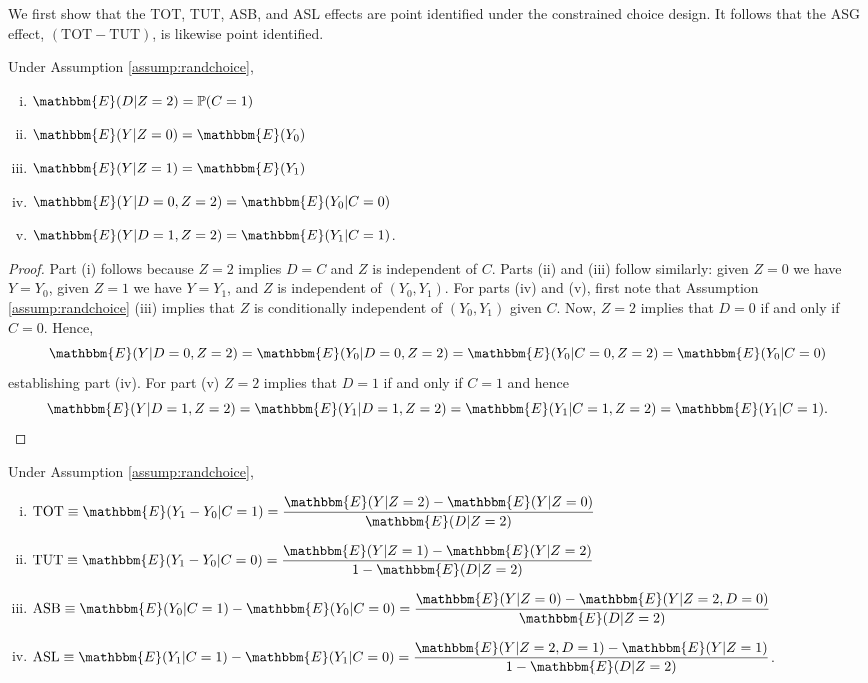 We first show that the TOT, TUT, ASB, and ASL effects are point identified under the constrained choice design.
It follows that the ASG effect, $(\text{TOT} - \text{TUT})$, is likewise point identified. 

\begin{lem}
Under Assumption \ref{assump:randchoice},
\label{lem_randchoice}
   \begin{enumerate}[(i)]
       \item $\mathbbm{E}(D|Z=2) = \mathbb{P}(C=1)$
       \item $\mathbbm{E}(Y|Z=0) = \mathbbm{E}(Y_0)$
       \item $\mathbbm{E}(Y|Z=1) = \mathbbm{E}(Y_1)$
       \item $\mathbbm{E}(Y|D=0,Z=2) = \mathbbm{E}(Y_0|C=0)$
       \item $\mathbbm{E}(Y|D=1,Z=2) = \mathbbm{E}(Y_1|C=1)$.
   \end{enumerate} 
\end{lem}

\begin{proof}
Part (i) follows because $Z=2$ implies $D=C$ and $Z$ is independent of $C$.  
Parts (ii) and (iii) follow similarly: given $Z=0$ we have $Y = Y_0$, given $Z=1$ we have $Y = Y_1$, and $Z$ is independent of $(Y_0,Y_1)$.
For parts (iv) and (v), first note that Assumption \ref{assump:randchoice} (iii) implies that $Z$ is conditionally independent of $(Y_0,Y_1)$ given $C$.
Now, $Z=2$ implies that $D=0$ if and only if $C=0$. Hence,
\[
\mathbbm{E}(Y|D=0, Z=2) = \mathbbm{E}(Y_0|D=0, Z=2) = \mathbbm{E}(Y_0|C=0, Z=2)=\mathbbm{E}(Y_0|C=0)
\]
establishing part (iv).
For part (v) $Z=2$ implies that $D=1$ if and only if $C=1$ and hence
\[
\mathbbm{E}(Y|D=1, Z=2) = \mathbbm{E}(Y_1|D=1, Z=2) = \mathbbm{E}(Y_1|C=1, Z=2)= \mathbbm{E}(Y_1|C=1). %
\]
\end{proof}

\begin{prop} 
Under Assumption \ref{assump:randchoice},
    \begin{enumerate}[(i)]
        \item $\text{TOT} \equiv \mathbbm{E}(Y_1 - Y_0|C=1)  = \displaystyle \frac{\mathbbm{E}(Y|Z=2) - \mathbbm{E}(Y|Z=0)}{\mathbbm{E}(D|Z=2)}$
        \item $\text{TUT} \equiv \mathbbm{E}(Y_1 - Y_0|C=0) = \displaystyle \frac{\mathbbm{E}(Y|Z=1) - \mathbbm{E}(Y|Z=2)}{1 - \mathbbm{E}(D|Z=2)}$
        \item $\text{ASB} \equiv \mathbbm{E}(Y_0|C=1) - \mathbbm{E}(Y_0|C=0) = \displaystyle \frac{\mathbbm{E}(Y|Z=0) - \mathbbm{E}(Y|Z=2,D=0)}{\mathbbm{E}(D|Z=2)}$
        \item $\text{ASL} \equiv \mathbbm{E}(Y_1|C=1) - \mathbbm{E}(Y_1|C=0) = \displaystyle \frac{\mathbbm{E}(Y|Z=2,D=1) - \mathbbm{E}(Y|Z=1)}{1 - \mathbbm{E}(D|Z=2)}$.
    \end{enumerate}
\end{prop}

